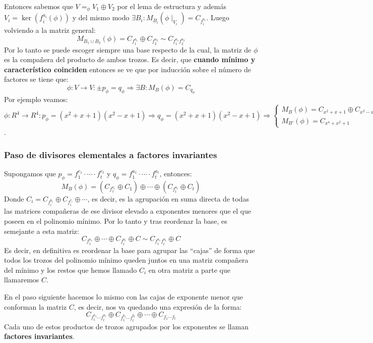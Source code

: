 \documentclass[10pt,a4paper,openright]{book}
\theoremstyle{break}
\begin{document}
Entonces sabemos que $V=_\phi V_1\oplus V_2$ por el lema de estructura y además $V_i=\ker (f_i^{a_i}(\phi))$ y del mismo modo $\exists B_i: M_{B_i}(\phi\mid_{V_i})=C_{f_i^{a_i}}$. Luego volviendo a la matriz general:
$$M_{B_1\cup B_2}(\phi)=C_{f_1^{a_1}}\oplus C_{f_2^{a_2}}\sim C_{f_1^{a_1}f_2^{a_2}}$$
Por lo tanto se puede escoger siempre una base respecto de la cual, la matriz de $\phi$ es la compañera del producto de ambos trozos.
Es decir, que \textbf{cuando mínimo y característico coinciden} entonces se ve que por inducción sobre el número de factores se tiene que:
$$\phi: V\rightarrow V:\pm p_\phi = q_\phi \Rightarrow \exists B: M_{B}(\phi)=C_{q_{\phi}}$$
Por ejemplo veamos:
$\phi: R^{4}\rightarrow R^{4}: p_\phi=(x^2+x+1)(x^2-x+1)\Rightarrow q_\phi=(x^2+x+1)(x^2-x+1)\Rightarrow \begin{cases} M_{B}(\phi)=C_{x^2+x+1}\oplus C_{x^2-x+1} & \mbox{ por divisores elementales}\\ M_{B'}(\phi)= C_{x^4+x^2+1}& \mbox{ por factores invariantes}\end{cases}$.

\subsubsection*{Paso de divisores elementales a factores invariantes}
Supongamos que $p_\phi = f_1^{e_1}\cdot \cdots \cdot f_t^{e_t}$ y $q_\phi= f_1^{a_1}\cdot \cdots \cdot f_t^{a_t}$, entonces:
$$M_B(\phi)=\left(C_{f_1^{a_1}} \oplus C_{1}\right)\oplus \cdots \oplus \left(C_{f_t^{a_t}} \oplus C_{t}\right)$$
Donde $C_i=C_{f_i^{b_1}}\oplus C_{f_i^{c_i}} \oplus \cdots$, es decir, es la agrupación en suma directa de todas las matrices compañeras de ese divisor elevado a exponentes menores que el que poseen en el polinomio mínimo. Por lo tanto y tras reordenar la base, es semejante a esta matriz:
$$C_{f_1^{a_1}}\oplus \cdots\oplus C_{f_t^{a_t}}\oplus C\sim C_{f_1^{a_1}f_t^{a_t}}\oplus C$$
Es decir, en definitiva es reordenar la base para agrupar las ``cajas'' de forma que todos los trozos del polinomio mínimo queden juntos en una matriz compañera del mínimo y los restos que hemos llamado $C_i$ en otra matriz a parte que llamaremos $C$.

En el paso siguiente hacemos lo mismo con las cajas de exponente menor que conforman la matriz $C$, es decir, nos va quedando una expresión de la forma:
$$C_{f_1^{a_1}\cdots f_t^{a_t}}\oplus C_{f_1^{b_1}\cdots f_t^{b_t}} \oplus \cdots \oplus C_{f_1\cdots f_t}$$
Cada uno de estos productos de trozos agrupados por los exponentes se llaman \textbf{factores invariantes}.
\end{document}
